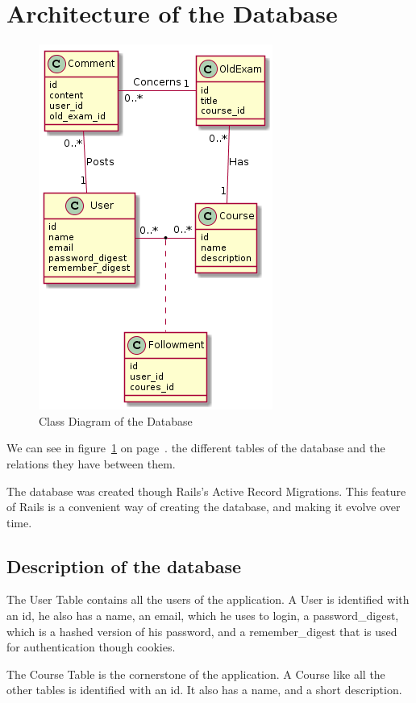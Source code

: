 \documentclass[12pt,a4paper]{article}
\begin{document}
\section{Architecture of the Database}

\begin{figure}[h]
	\centering
	\includegraphics[scale=0.7]{src/digram.png}
	\caption{\label{fig:uml} Class Diagram of the Database}
\end{figure}

We can see in figure~\ref{fig:uml} on page~\pageref{fig:uml}. the different tables of the database and the
relations they have between them.

The database was created though Rails's Active Record Migrations. This feature of
Rails is a convenient way of creating the database, and making it evolve
over time.


\subsection{Description of the database}

The User Table contains all the users of the application. A User is identified
with an id, he also has a name, an email, which he uses to login, a
password\_digest, which is a hashed version of his password, and a
remember\_digest that is used for authentication though cookies.

The Course Table is the cornerstone of the application. A Course like all the
other tables is identified with an id. It also has a name, and a short
description.
\end{document}
